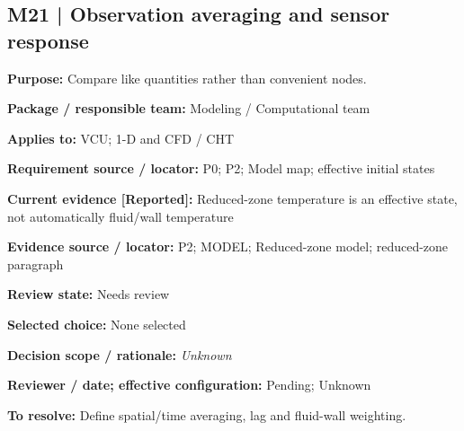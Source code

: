\documentclass[11pt]{article}
\begin{document}
\par\noindent\begin{minipage}{\textwidth}\small\setlength{\parskip}{2pt}
\subsection*{M21 | Observation averaging and sensor response}
\textbf{Purpose:} Compare like quantities rather than convenient nodes.\par
\textbf{Package / responsible team:} Modeling / Computational team\par
\textbf{Applies to:} VCU; 1-D and CFD / CHT\par
\textbf{Requirement source / locator:} P0; P2; Model map; effective initial states\par
\textbf{Current evidence [Reported]:} Reduced-zone temperature is an effective state, not automatically fluid/wall temperature\par
\textbf{Evidence source / locator:} P2; MODEL; Reduced-zone model; reduced-zone paragraph\par
\textbf{Review state:} Needs review\par
\textbf{Selected choice:} None selected\par
\textbf{Decision scope / rationale:} \textit{Unknown}\par
\textbf{Reviewer / date; effective configuration:} Pending; Unknown\par
\textbf{To resolve:} Define spatial/time averaging, lag and fluid-wall weighting.\par
\end{minipage}\par\vspace{5pt}
\end{document}
